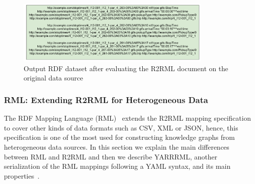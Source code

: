 \begin{figure}[!ht]
\centering
\includegraphics[width=0.85\textwidth]{figures/state-of-the-art/RDF_from Stop_times.pdf}
\caption[RDF Generation from R2RML mapping rules]{Output RDF dataset after evaluating the R2RML document on the original data source}
\label{fig:soa_rdf}
\end{figure}



\subsubsection{RML: Extending R2RML for Heterogeneous Data}
The RDF Mapping Language (RML)~\citep{dimou2014rml} extends the R2RML mapping specification to cover other kinds of data formats such as CSV, XML or JSON, hence, this specification is one of the most used for constructing knowledge graphs from heterogeneous data sources. In this section we explain the main differences between RML and R2RML and then we describe YARRRML, another serialization of the RML mappings following a YAML syntax, and its main properties~\citep{Heyvaert2018Declarative}.


